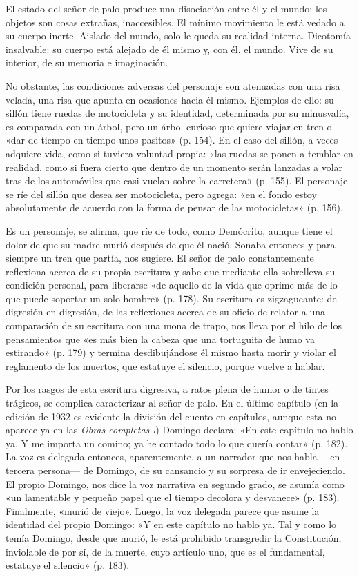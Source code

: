 \documentclass[14pt,twoside,final]{extbook} %
\begin{document}
El estado del señor de palo produce una disociación entre él y el mundo: los objetos son cosas extrañas, inaccesibles. El mínimo movimiento le está vedado a su cuerpo inerte. Aislado del mundo, solo le queda su realidad interna. Dicotomía insalvable: su cuerpo está alejado de él mismo y, con él, el mundo. Vive de su interior, de su memoria e imaginación.

No obstante, las condiciones adversas del personaje son atenuadas con una risa velada, una risa que apunta en ocasiones hacia él mismo. Ejemplos de ello: su sillón tiene ruedas de motocicleta y su identidad, determinada por su minusvalía, es comparada con un árbol, pero un árbol curioso que quiere viajar en tren o «dar de tiempo en tiempo unos pasitos» (p. 154). En el caso del sillón, a veces adquiere vida, como si tuviera voluntad propia: «las ruedas se ponen a temblar en realidad, como si fuera cierto que dentro de un momento serán lanzadas a volar tras de los automóviles que casi vuelan sobre la carretera» (p. 155). El personaje se ríe del sillón que desea ser motocicleta, pero agrega: «en el fondo estoy absolutamente de acuerdo con la forma de pensar de las motocicletas» (p. 156).

Es un personaje, se afirma, que ríe de todo, como Demócrito, aunque tiene el dolor de que su madre murió después de que él nació. Sonaba entonces y para siempre un tren que partía, nos sugiere. El señor de palo constantemente reflexiona acerca de su propia escritura y sabe que mediante ella sobrelleva su condición personal, para liberarse «de aquello de la vida que oprime más de lo que puede soportar un solo hombre» (p. 178). Su escritura es zigzagueante: de digresión en digresión, de las reflexiones acerca de su oficio de relator a una comparación de su escritura con una mona de trapo, nos lleva por el hilo de los pensamientos que «es más bien la cabeza que una tortuguita de humo va estirando» (p. 179) y termina desdibujándose él mismo hasta morir y violar el reglamento de los muertos, que estatuye el silencio, porque vuelve a hablar.

Por los rasgos de esta escritura digresiva, a ratos plena de humor o de tintes trágicos, se complica caracterizar al señor de palo. En el último capítulo (en la edición de 1932 es evidente la división del cuento en capítulos, aunque esta no aparece ya en las \emph{Obras completas \textsc{i}}) Domingo declara: «En este capítulo no hablo ya. Y me importa un comino; ya he contado todo lo que quería contar» (p. 182). La voz es delegada entonces, aparentemente, a un narrador que nos habla ---en tercera persona--- de Domingo, de su cansancio y su sorpresa de ir envejeciendo. El propio Domingo, nos dice la voz narrativa en segundo grado, se asumía como «un lamentable y pequeño papel que el tiempo decolora y desvanece» (p. 183). Finalmente, «murió de viejo». Luego, la voz delegada parece que asume la identidad del propio Domingo: «Y en este capítulo no hablo ya. Tal y como lo temía Domingo, desde que murió, le está prohibido transgredir la Constitución, inviolable de por sí, de la muerte, cuyo artículo uno, que es el fundamental, estatuye el silencio» (p. 183).
\end{document}
